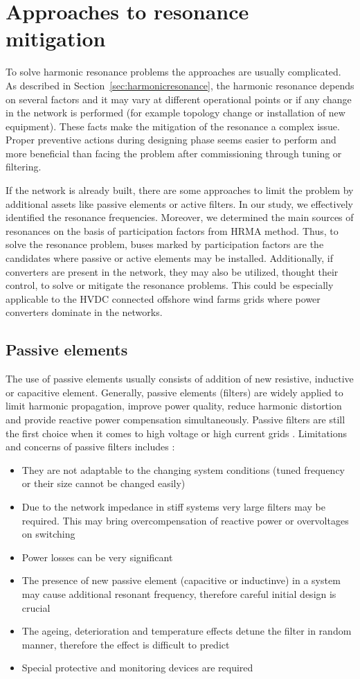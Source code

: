 \documentclass[a4paper,11pt,twoside,openright]{report}
\begin{document}
\chapter{Approaches to resonance mitigation} \label{sec:mitigation}
To solve harmonic resonance problems the approaches are usually complicated. As described in Section~\ref{sec:harmonicresonance}, the harmonic resonance depends on several factors and it may vary at different operational points or if any change in the network is performed (for example topology change or installation of new equipment). These facts make the mitigation of the resonance a complex issue. Proper preventive actions during designing phase seems easier to perform and more beneficial than facing the problem after commissioning through tuning or filtering.

If the network is already built, there are some approaches to limit the problem by additional assets like passive elements or active filters. In our study, we effectively identified the resonance frequencies. Moreover, we determined the main sources of resonances on the basis of participation factors from HRMA method. Thus, to solve the resonance problem, buses marked by participation factors are the candidates where passive or active elements may be installed. Additionally, if converters are present in the network, they may also be utilized, thought their control, to solve or mitigate the resonance problems. This could be especially applicable to the HVDC connected offshore wind farms grids where power converters dominate in the networks.

\section{Passive elements}
The use of passive elements usually consists of addition of new resistive, inductive or capacitive element. Generally, passive elements (filters) are widely applied to limit harmonic propagation, improve power quality, reduce harmonic distortion and provide reactive power compensation simultaneously. Passive filters are still the first choice when it comes to high voltage or high current grids \cite{das}. Limitations and concerns of passive filters includes \cite{das}:
\begin{itemize}
	\item They are not adaptable to the changing system conditions (tuned frequency or their size cannot be changed easily)
	\item Due to the network impedance in stiff systems very large filters may be required. This may bring overcompensation of reactive power or overvoltages on switching
	\item Power losses can be very significant
	\item The presence of new passive element (capacitive or inductinve) in a system may cause additional resonant frequency, therefore careful initial design is crucial
	\item The ageing, deterioration and temperature effects detune the filter in random manner, therefore the effect is difficult to predict
	\item Special protective and monitoring devices are required
\end{itemize}
\end{document}
